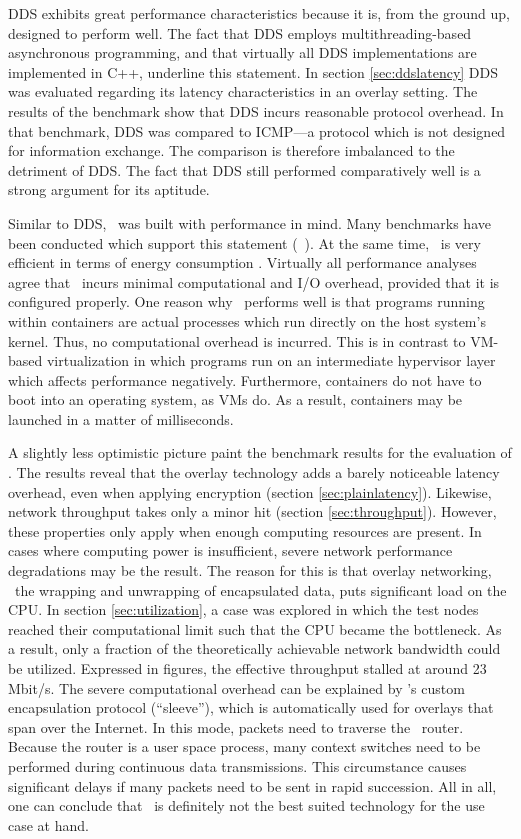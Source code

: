 DDS exhibits great performance characteristics because it is, from the ground up, designed to perform well. The fact that DDS employs multithreading-based asynchronous programming, and that virtually all DDS implementations are implemented in C++, underline this statement. In section \ref{sec:ddslatency} DDS was evaluated regarding its latency characteristics in an overlay setting. The results of the benchmark show that DDS incurs reasonable protocol overhead. In that benchmark, DDS was compared to ICMP---a protocol which is not designed for information exchange. The comparison is therefore imbalanced to the detriment of DDS. The fact that DDS still performed comparatively well is a strong argument for its aptitude. 

Similar to DDS, \docker\ was built with performance in mind. Many benchmarks have been conducted which support this statement (\eg\ \cite{adufu2015container, felter2015updated, morabito2015hypervisors, xavier2013performance}). At the same time, \docker\ is very efficient in terms of energy consumption \cite{morabito2015power}. Virtually all performance analyses agree that \docker\ incurs minimal computational and I/O overhead, provided that it is configured properly. One reason why \docker\ performs well is that programs running within containers are actual processes which run directly on the host system's kernel. Thus, no computational overhead is incurred. This is in contrast to VM-based virtualization in which programs run on an intermediate hypervisor layer which affects performance negatively. Furthermore, containers do not have to boot into an operating system, as VMs do. As a result, containers may be launched in a matter of milliseconds.

A slightly less optimistic picture paint the benchmark results for the evaluation of \wnet . The results reveal that the overlay technology adds a barely noticeable latency overhead, even when applying encryption (\cf section \ref{sec:plainlatency}). Likewise, network throughput takes only a minor hit (\cf section \ref{sec:throughput}). However, these properties only apply when enough computing resources are present. In cases where computing power is insufficient, severe network performance degradations may be the result. The reason for this is that overlay networking, \ie\ the wrapping and unwrapping of encapsulated data, puts significant load on the CPU. In section \ref{sec:utilization}, a case was explored in which the test nodes reached their computational limit such that the CPU became the bottleneck. As a result, only a fraction of the theoretically achievable network bandwidth could be utilized. Expressed in figures, the effective throughput stalled at around 23 Mbit/s. The severe computational overhead can be explained by \weave 's custom encapsulation protocol (``sleeve''), which is automatically used for overlays that span over the Internet. In this mode, packets need to traverse the \weave\ router. Because the router is a user space process, many context switches need to be performed during continuous data transmissions. This circumstance causes significant delays if many packets need to be sent in rapid succession. All in all, one can conclude that \wnet\ is definitely not the best suited technology for the use case at hand.


